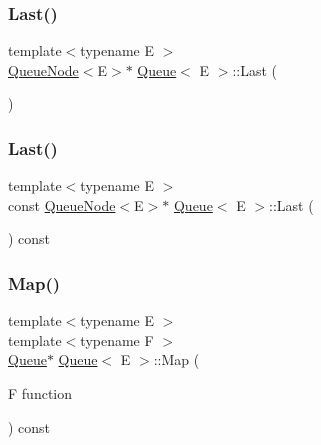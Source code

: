 \mbox{\label{classQueue_a430aca3d3b9f5fd588b215028d134b74}} 
\subsubsection{\texorpdfstring{Last()}{Last()}\hspace{0.1cm}{\footnotesize\ttfamily [1/2]}}
{\footnotesize\ttfamily template$<$typename E $>$ \\
\hyperlink{classQueueNode}{Queue\+Node}$<$E$>$$\ast$ \hyperlink{classQueue}{Queue}$<$ E $>$\+::Last (\begin{DoxyParamCaption}{ }\end{DoxyParamCaption})\hspace{0.3cm}{\ttfamily [inline]}}

\mbox{\label{classQueue_a7c8c2c64700dfe1df8bf266572cf101a}} 
\subsubsection{\texorpdfstring{Last()}{Last()}\hspace{0.1cm}{\footnotesize\ttfamily [2/2]}}
{\footnotesize\ttfamily template$<$typename E $>$ \\
const \hyperlink{classQueueNode}{Queue\+Node}$<$E$>$$\ast$ \hyperlink{classQueue}{Queue}$<$ E $>$\+::Last (\begin{DoxyParamCaption}{ }\end{DoxyParamCaption}) const\hspace{0.3cm}{\ttfamily [inline]}}

\mbox{\label{classQueue_a904a696292fc593adc6fd21fb229d760}} 
\subsubsection{\texorpdfstring{Map()}{Map()}}
{\footnotesize\ttfamily template$<$typename E $>$ \\
template$<$typename F $>$ \\
\hyperlink{classQueue}{Queue}$\ast$ \hyperlink{classQueue}{Queue}$<$ E $>$\+::Map (\begin{DoxyParamCaption}\item[{F}]{function }\end{DoxyParamCaption}) const\hspace{0.3cm}{\ttfamily [inline]}}

